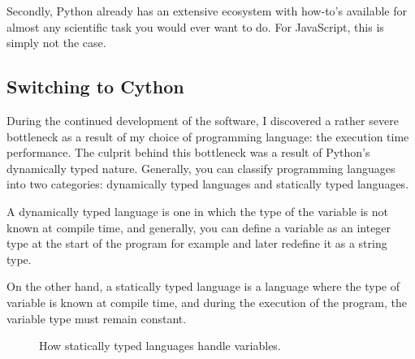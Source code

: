Secondly, Python already has an extensive ecosystem with how-to’s available for almost any scientific task you would ever want to do. For JavaScript, this is simply not the case.\cite{javascript_vs_python}

\subsection{Switching to Cython}
During the continued development of the software, I discovered a rather severe bottleneck as a result of my choice of programming language: the execution time performance. The culprit behind this bottleneck was a result of Python's dynamically typed nature. Generally, you can classify programming languages into two categories: dynamically typed languages and statically typed languages. 

\begin{definition}
A dynamically typed language is one in which the type of the variable is not known at compile time, and generally, you can define a variable as an integer type at the start of the program for example and later redefine it as a string type. 
\end{definition}

On the other hand, a statically typed language is a language where the type of variable is known at compile time, and during the execution of the program, the variable type must remain constant. 

\hfill

\begin{figure}[H]
    \centering
    \caption{How statically typed languages handle variables.}
\end{figure}

